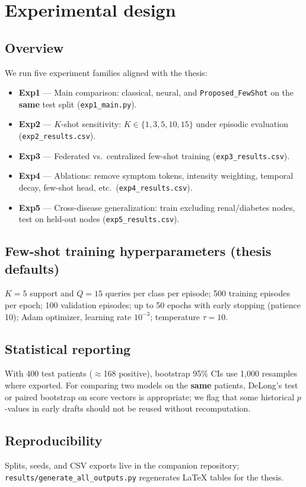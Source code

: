 \section{Experimental design}
\label{sec:exp}

\subsection{Overview}
We run five experiment families aligned with the thesis:
\begin{itemize}
  \item \textbf{Exp1} --- Main comparison: classical, neural, and \texttt{Proposed\_FewShot} on the \textbf{same} test split (\texttt{exp1\_main.py}).
  \item \textbf{Exp2} --- $K$-shot sensitivity: $K \in \{1,3,5,10,15\}$ under episodic evaluation (\texttt{exp2\_results.csv}).
  \item \textbf{Exp3} --- Federated vs.\ centralized few-shot training (\texttt{exp3\_results.csv}).
  \item \textbf{Exp4} --- Ablations: remove symptom tokens, intensity weighting, temporal decay, few-shot head, etc.\ (\texttt{exp4\_results.csv}).
  \item \textbf{Exp5} --- Cross-disease generalization: train excluding renal/diabetes nodes, test on held-out nodes (\texttt{exp5\_results.csv}).
\end{itemize}

\subsection{Few-shot training hyperparameters (thesis defaults)}
$K{=}5$ support and $Q{=}15$ queries per class per episode; 500 training episodes per epoch; 100 validation episodes; up to 50 epochs with early stopping (patience 10); Adam optimizer, learning rate $10^{-3}$; temperature $\tau{=}10$.

\subsection{Statistical reporting}
With 400 test patients ($\approx$168 positive), bootstrap 95\% CIs use 1{,}000 resamples where exported. For comparing two models on the \textbf{same} patients, DeLong's test or paired bootstrap on score vectors is appropriate; we flag that some historical $p$-values in early drafts should not be reused without recomputation.

\subsection{Reproducibility}
Splits, seeds, and CSV exports live in the companion repository; \texttt{results/generate\_all\_outputs.py} regenerates LaTeX tables for the thesis.
